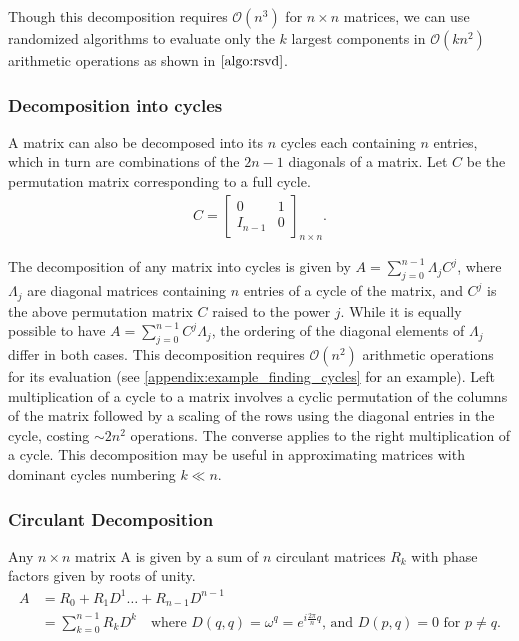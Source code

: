 \documentclass[onefignum,onetabnum]{siamart171218}
\begin{document}
Though this decomposition requires $\mathcal{O}(n^3)$ for $n \times n$ matrices, we can use randomized algorithms to evaluate only the $k$ largest components in $\mathcal{O}(kn^2)$ arithmetic operations as shown in $\cref{algo:rsvd}$.

\subsubsection{Decomposition into cycles}\label{cycle-decomp}
A matrix can also be decomposed into its $n$ cycles each containing $n$ entries, which in turn are combinations of the $2n-1$ diagonals of a matrix. Let $C$ be the permutation matrix corresponding to a full cycle.
\begin{align}
	C = 
	\begin{bmatrix}
	0 & 1 \\
	I_{n-1} & 0 
	\end{bmatrix}_{ n \times n}.
        \label{exp: of C}
        \end{align}

\vspace{0.2cm}
The decomposition of any matrix into cycles is given by $A = \sum_{j=0}^{n-1} \Lambda_jC^j$, where $\Lambda_j$ are diagonal matrices containing $n$ entries of a cycle of the matrix, and $C^j$ is the above permutation matrix $C$ raised to the power $j$. While it is equally possible to have $A = \sum_{j=0}^{n-1} C^j \Lambda_j$, the ordering of the diagonal elements of $\Lambda_j$ differ in both cases. This decomposition requires $\mathcal{O}(n^2)$ arithmetic operations for its evaluation (see \cref{appendix:example_finding_cycles} for an example). Left multiplication of a cycle to a matrix involves a cyclic permutation of the columns of the matrix followed by a scaling of the rows using the diagonal entries in the cycle, costing $\sim 2n^2$ operations. The converse applies to the right multiplication of a cycle. This decomposition may be useful in approximating matrices with dominant cycles numbering $k \ll n$.


\subsubsection{Circulant Decomposition}

\begin{theorem}\label{th:circulant_decomposition}
Any $n \times n$ matrix A is given by a sum of $n$ circulant matrices $R_k$ with phase factors given by roots of unity.
\begin{align*}
    A &= R_{0} + R_{1}D^1 \dots + R_{n-1}D^{n-1} \\
    &= \sum_{k = 0}^{n-1} R_{k}D^k \quad \text{where } D(q,q) = \omega^q = e^{i\frac{2 \pi}{n} q} \text{, and }
    D(p,q) =0 \text{ for }p \neq q.   
\end{align*}

\end{theorem}
\end{document}
